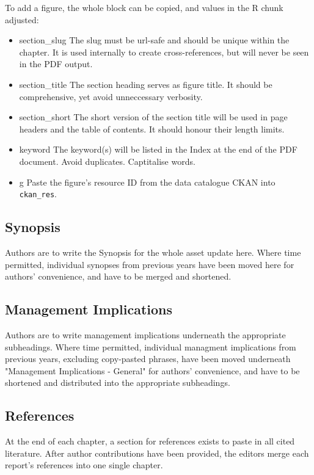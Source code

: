 To add a figure, the whole block can be copied, and values in the R chunk adjusted:

\begin{itemize}
  \item{section\_slug} The slug must be url-safe and should be unique within the chapter.
  It is used internally to create cross-references, but will never be seen in the
  PDF output.
  \item{section\_title} The section heading serves as figure title. It should be
  comprehensive, yet avoid unneccessary verbosity.
  \item{section\_short} The short version of the section title will be used in
  page headers and the table of contents. It should honour their length limits.
  \item{keyword} The keyword(s) will be listed in the Index at the end of the
  PDF document. Avoid duplicates. Captitalise words.
  \item{g} Paste the figure's resource ID from the data catalogue CKAN into
  \texttt{ckan\_res}.
\end{itemize}

\subsection*{Synopsis}
Authors are to write the Synopsis for the whole asset update here.
Where time permitted, individual synopses from previous years have been moved
here for authors' convenience, and have to be merged and shortened.

\subsection*{Management Implications}
Authors are to write management implications underneath the appropriate subheadings.
Where time permitted, individual managment implications from previous years,
excluding copy-pasted phrases, have been moved underneath
"Management Implications - General" for authors' convenience, and have to be
shortened and distributed into the appropriate subheadings.

\subsection*{References}
At the end of each chapter, a section for references exists to paste in all cited literature.
After author contributions have been provided, the editors merge each report's
references into one single chapter.

